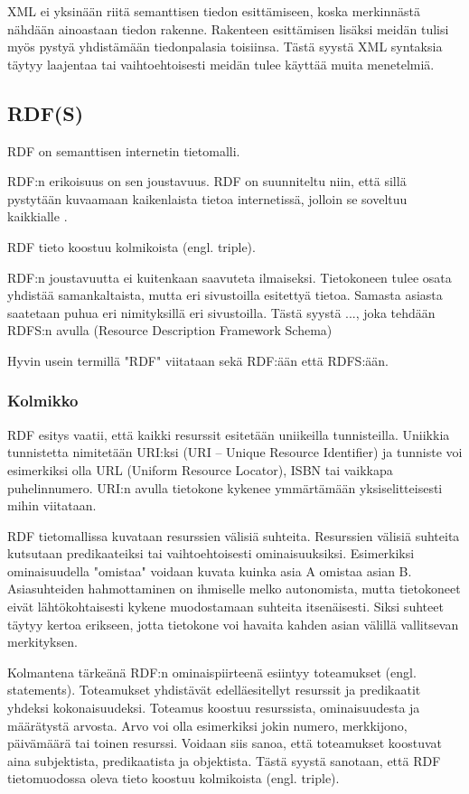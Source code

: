 \documentclass[finnish, 12pt, a4paper, elec, utf8, pdfa, online]{aaltothesis}
\begin{document}
XML ei yksinään riitä semanttisen tiedon esittämiseen, koska merkinnästä nähdään ainoastaan tiedon rakenne. Rakenteen esittämisen lisäksi meidän tulisi myös pystyä yhdistämään tiedonpalasia toisiinsa. Tästä syystä XML syntaksia täytyy laajentaa tai vaihtoehtoisesti meidän tulee käyttää muita menetelmiä.


\subsection{RDF(S)}
RDF on semanttisen internetin tietomalli.

RDF:n erikoisuus on sen joustavuus. RDF on suunniteltu niin, että sillä pystytään kuvaamaan kaikenlaista tietoa internetissä, jolloin se soveltuu kaikkialle \cite{RDF_specification}.

RDF tieto koostuu kolmikoista (engl. triple).


RDF:n joustavuutta ei kuitenkaan saavuteta ilmaiseksi. Tietokoneen tulee osata yhdistää samankaltaista, mutta eri sivustoilla esitettyä tietoa. Samasta asiasta saatetaan puhua eri nimityksillä eri sivustoilla. Tästä syystä ..., joka tehdään RDFS:n avulla (Resource Description Framework Schema)

Hyvin usein termillä "RDF" viitataan sekä RDF:ään että RDFS:ään.

\subsubsection{Kolmikko}
RDF esitys vaatii, että kaikki resurssit esitetään uniikeilla tunnisteilla. Uniikkia tunnistetta nimitetään URI:ksi (URI – Unique Resource Identifier) ja tunniste voi esimerkiksi olla URL (Uniform Resource Locator), ISBN tai vaikkapa puhelinnumero. URI:n avulla tietokone kykenee ymmärtämään yksiselitteisesti mihin viitataan.

RDF tietomallissa kuvataan resurssien välisiä suhteita. Resurssien välisiä suhteita kutsutaan predikaateiksi tai vaihtoehtoisesti ominaisuuksiksi. Esimerkiksi ominaisuudella "omistaa" voidaan kuvata kuinka asia A omistaa asian B. Asiasuhteiden hahmottaminen on ihmiselle melko autonomista, mutta tietokoneet eivät lähtökohtaisesti kykene muodostamaan suhteita itsenäisesti. Siksi suhteet täytyy kertoa erikseen, jotta tietokone voi havaita kahden asian välillä vallitsevan merkityksen.


Kolmantena tärkeänä RDF:n ominaispiirteenä esiintyy toteamukset (engl. statements). Toteamukset yhdistävät edelläesitellyt resurssit ja predikaatit yhdeksi kokonaisuudeksi. Toteamus koostuu resurssista, ominaisuudesta ja määrätystä arvosta. Arvo voi olla esimerkiksi jokin numero, merkkijono, päivämäärä tai toinen resurssi. Voidaan siis sanoa, että toteamukset koostuvat aina subjektista, predikaatista ja objektista. Tästä syystä sanotaan, että RDF tietomuodossa oleva tieto koostuu kolmikoista (engl. triple).
\end{document}
